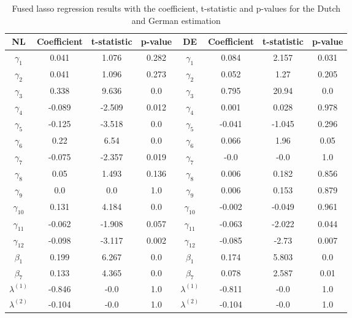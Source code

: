 \begin{table}[]
    \centering
    \begin{tabular}{|c|c c c||c|c c c|}\hline
        NL & Coefficient & t-statistic & p-value & DE & Coefficient & t-statistic & p-value\\\hline
        $\gamma_{1}$ & 0.041 & 1.076 & 0.282 & $\gamma_{1}$ & 0.084 & 2.157 & 0.031\\
        $\gamma_{2}$ & 0.041 & 1.096 & 0.273 & $\gamma_{2}$ & 0.052 & 1.27 & 0.205\\
        $\gamma_{3}$ & 0.338 & 9.636 & 0.0 & $\gamma_{3}$ & 0.795 & 20.94 & 0.0\\
        $\gamma_{4}$ & -0.089 & -2.509 & 0.012 & $\gamma_{4}$ & 0.001 & 0.028 & 0.978\\
        $\gamma_{5}$ & -0.125 & -3.518 & 0.0 & $\gamma_{5}$ & -0.041 & -1.045 & 0.296\\
        $\gamma_{6}$ & 0.22 & 6.54 & 0.0 & $\gamma_{6}$ & 0.066 & 1.96 & 0.05\\
        $\gamma_{7}$ & -0.075 & -2.357 & 0.019 & $\gamma_{7}$ & -0.0 & -0.0 & 1.0\\
        $\gamma_{8}$ & 0.05 & 1.493 & 0.136 & $\gamma_{8}$ & 0.006 & 0.182 & 0.856\\
        $\gamma_{9}$ & 0.0 & 0.0 & 1.0 & $\gamma_{9}$ & 0.006 & 0.153 & 0.879\\
        $\gamma_{10}$ & 0.131 & 4.184 & 0.0 & $\gamma_{10}$ & -0.002 & -0.049 & 0.961\\
        $\gamma_{11}$ & -0.062 & -1.908 & 0.057 & $\gamma_{11}$ & -0.063 & -2.022 & 0.044\\
        $\gamma_{12}$ & -0.098 & -3.117 & 0.002 & $\gamma_{12}$ & -0.085 & -2.73 & 0.007\\
        $\beta_{1}$ & 0.199 & 6.267 & 0.0 & $\beta_{1}$ & 0.174 & 5.803 & 0.0\\
        $\beta_{7}$ & 0.133 & 4.365 & 0.0 & $\beta_{7}$ & 0.078 & 2.587 & 0.01\\
        $\lambda^{(1)}$ & -0.846 & -0.0 & 1.0 & $\lambda^{(1)}$ & -0.811 & -0.0 & 1.0\\
        $\lambda^{(2)}$ & -0.104 & -0.0 & 1.0 & $\lambda^{(2)}$ & -0.104 & -0.0 & 1.0\\ \hline
    \end{tabular}
    \caption{Fused lasso regression results with the coefficient, t-statistic and p-values for the Dutch and German estimation}
    \label{tab:FLASSO_estimation_results}
\end{table}
